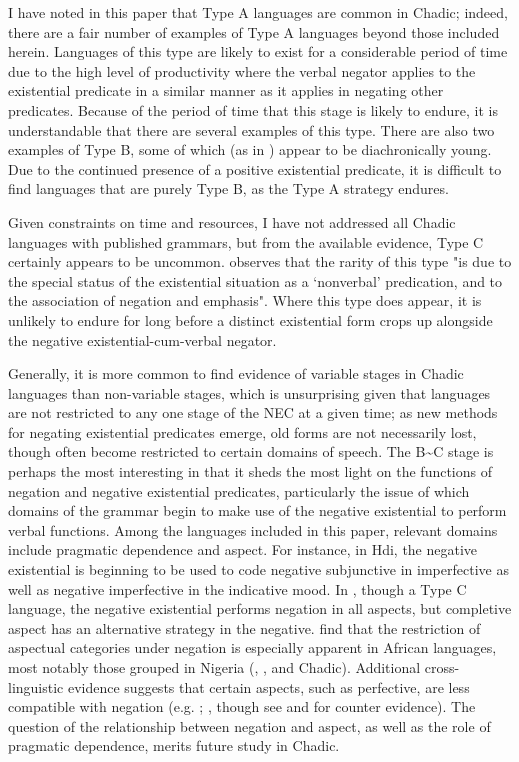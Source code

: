 \documentclass[output=paper,draft,draftmode,colorlinks,citecolor=brown]{langscibook}
\begin{document}
I have noted in this paper that Type A languages are common in Chadic;
indeed, there are a fair number of examples of Type A languages beyond those included
herein. Languages of this type are likely to exist for a considerable
period of time due to the high level of productivity where the verbal
negator applies to the existential predicate in a similar manner as it
applies in negating other predicates. Because of the period of time
that this stage is likely to endure, it is understandable that there are
several examples of this type. There are also two examples of Type
B, some of which (as in ) appear to be diachronically young.  Due
to the continued presence of a positive existential predicate, it is
difficult to find languages that are purely Type B, as the Type A strategy
endures.

Given constraints on time and resources, I have not addressed all Chadic languages with published grammars, but from the available evidence, Type C certainly appears to be uncommon. \citet[18]{Croft1991} observes that the rarity of this type "is due to the special status of the existential situation as a `nonverbal' predication, and to the association of negation and emphasis".  Where this type does appear, it is unlikely to endure for long before a distinct existential form crops up alongside the negative existential-cum-verbal negator.

Generally, it is more common to find evidence of variable stages in Chadic
languages than non-variable stages, which is unsurprising given that
languages are not restricted to any one stage of the NEC at a given time;
as new methods for negating existential predicates emerge, old forms are
not necessarily lost, though often become restricted to certain domains of
speech. The B{\textasciitilde}C stage is perhaps the most interesting in
that it sheds the most light on the functions of negation and negative
existential predicates, particularly the issue of which domains of the
grammar begin to make use of the negative existential to perform verbal
functions. Among the languages included in this paper, relevant domains
include pragmatic dependence and aspect. For instance, in Hdi, the negative
existential is beginning to be used to code negative subjunctive in
imperfective as well as negative imperfective in the indicative mood. In
, though a Type C language, the negative existential performs
negation in all aspects, but completive aspect has an alternative strategy
in the negative. \citet[72]{MiestamoAuwera2011} find that the restriction of
aspectual categories under negation is especially apparent in African
languages, most notably those grouped in Nigeria (,
, and Chadic). Additional cross-linguistic
evidence suggests that certain aspects, such as perfective, are less compatible with
negation (e.g. \citealt[39]{Schmid1980}; \citealt[84]{Matthews1990}, though see and \citealt{MiestamoAuwera2011} for counter evidence). The question of
the relationship between negation and aspect, as well as the role of
pragmatic dependence, merits future study in Chadic.
\end{document}
